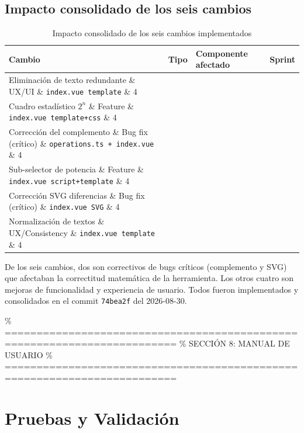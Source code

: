 \documentclass[11pt,a4paper]{article}
\begin{document}
\subsection{Impacto consolidado de los seis cambios}
\begin{table}[htbp]
\centering
\small
\caption{Impacto consolidado de los seis cambios implementados}
\begin{tabularx}{\textwidth}{p{4.5cm}p{2.5cm}Xc}
\toprule
\textbf{Cambio} & \textbf{Tipo} & \textbf{Componente afectado} & \textbf{Sprint} \\
\midrule
Eliminación de texto redundante \& UX/UI \& \texttt{index.vue template} \& 4 \\
Cuadro estadístico $2^n$ \& Feature \& \texttt{index.vue template+css} \& 4 \\
Corrección del complemento \& Bug fix (crítico) \& \texttt{operations.ts + index.vue} \& 4 \\
Sub-selector de potencia \& Feature \& \texttt{index.vue script+template} \& 4 \\
Corrección SVG diferencias \& Bug fix (crítico) \& \texttt{index.vue SVG} \& 4 \\
Normalización de textos \& UX/Consistency \& \texttt{index.vue template} \& 4 \\
\bottomrule
\end{tabularx}
\end{table}

De los seis cambios, dos son correctivos de bugs críticos (complemento y SVG) que afectaban la correctitud matemática de la herramienta. Los otros cuatro son mejoras de funcionalidad y experiencia de usuario. Todos fueron implementados y consolidados en el commit \texttt{74bea2f} del 2026-08-30.

\newpage

\% =========================================================================
\% SECCIÓN 8: MANUAL DE USUARIO
\% =========================================================================
\section{Pruebas y Validación}
\end{document}
